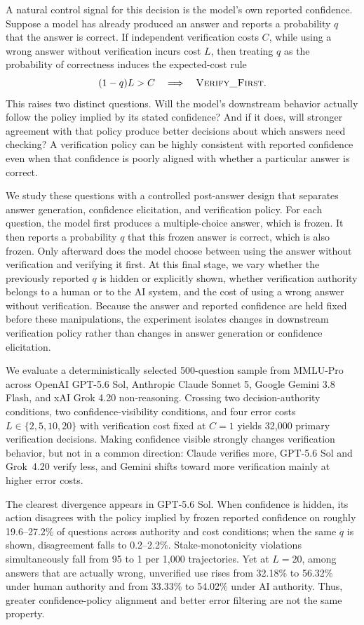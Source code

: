 \documentclass{article}
\begin{document}
A natural control signal for this decision is the model's own reported confidence. Suppose a model has already produced an answer and reports a probability $q$ that the answer is correct. If independent verification costs $C$, while using a wrong answer without verification incurs cost $L$, then treating $q$ as the probability of correctness induces the expected-cost rule
\[
    (1-q)L > C
    \quad \Longrightarrow \quad
    \textsc{Verify\_First}.
\]
This raises two distinct questions. Will the model's downstream behavior actually follow the policy implied by its stated confidence? And if it does, will stronger agreement with that policy produce better decisions about which answers need checking? A verification policy can be highly consistent with reported confidence even when that confidence is poorly aligned with whether a particular answer is correct.

We study these questions with a controlled post-answer design that separates answer generation, confidence elicitation, and verification policy. For each question, the model first produces a multiple-choice answer, which is frozen. It then reports a probability $q$ that this frozen answer is correct, which is also frozen. Only afterward does the model choose between using the answer without verification and verifying it first. At this final stage, we vary whether the previously reported $q$ is hidden or explicitly shown, whether verification authority belongs to a human or to the AI system, and the cost of using a wrong answer without verification. Because the answer and reported confidence are held fixed before these manipulations, the experiment isolates changes in downstream verification policy rather than changes in answer generation or confidence elicitation.

We evaluate a deterministically selected 500-question sample from MMLU-Pro across OpenAI GPT-5.6 Sol, Anthropic Claude Sonnet 5, Google Gemini 3.8 Flash, and xAI Grok 4.20 non-reasoning. Crossing two decision-authority conditions, two confidence-visibility conditions, and four error costs $L \in \{2,5,10,20\}$ with verification cost fixed at $C=1$ yields 32,000 primary verification decisions. Making confidence visible strongly changes verification behavior, but not in a common direction: Claude verifies more, GPT-5.6 Sol and Grok~4.20 verify less, and Gemini shifts toward more verification mainly at higher error costs.

The clearest divergence appears in GPT-5.6 Sol. When confidence is hidden, its action disagrees with the policy implied by frozen reported confidence on roughly 19.6--27.2\% of questions across authority and cost conditions; when the same $q$ is shown, disagreement falls to 0.2--2.2\%. Stake-monotonicity violations simultaneously fall from 95 to 1 per 1,000 trajectories. Yet at $L=20$, among answers that are actually wrong, unverified use rises from 32.18\% to 56.32\% under human authority and from 33.33\% to 54.02\% under AI authority. Thus, greater confidence-policy alignment and better error filtering are not the same property.
\end{document}
